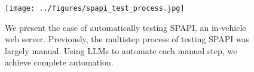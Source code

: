 \begin{figure}[t]
    \centering
    \texttt{[image: ../figures/spapi\_test\_process.jpg]}
    \caption{We present the case of automatically testing SPAPI, an in-vehicle web server. Previously, the multistep process of testing SPAPI was largely manual. Using LLMs to automate each manual step, we achieve complete automation.}
    \label{fig:spapi-test-process}
\end{figure}